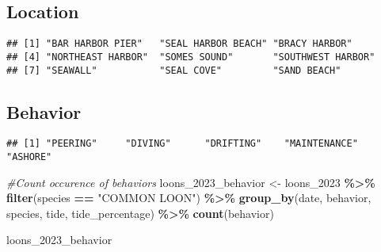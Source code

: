 \documentclass[
]{article}
\newenvironment{Shaded}{\begin{snugshade}}{\end{snugshade}}
\newcommand{\CommentTok}[1]{\textcolor[rgb]{0.56,0.35,0.01}{\textit{#1}}}
\newcommand{\FunctionTok}[1]{\textcolor[rgb]{0.13,0.29,0.53}{\textbf{#1}}}
\newcommand{\NormalTok}[1]{#1}
\newcommand{\OtherTok}[1]{\textcolor[rgb]{0.56,0.35,0.01}{#1}}
\newcommand{\SpecialCharTok}[1]{\textcolor[rgb]{0.81,0.36,0.00}{\textbf{#1}}}
\newcommand{\StringTok}[1]{\textcolor[rgb]{0.31,0.60,0.02}{#1}}
\begin{document}
\hypertarget{location}{%
\subsection{Location}\label{location}}

\begin{Shaded}
\end{Shaded}

\begin{verbatim}
## [1] "BAR HARBOR PIER"   "SEAL HARBOR BEACH" "BRACY HARBOR"     
## [4] "NORTHEAST HARBOR"  "SOMES SOUND"       "SOUTHWEST HARBOR" 
## [7] "SEAWALL"           "SEAL COVE"         "SAND BEACH"
\end{verbatim}

\hypertarget{behavior}{%
\subsection{Behavior}\label{behavior}}

\begin{Shaded}
\end{Shaded}

\begin{verbatim}
## [1] "PEERING"     "DIVING"      "DRIFTING"    "MAINTENANCE" "ASHORE"
\end{verbatim}

\begin{Shaded}
\begin{Highlighting}[]
\CommentTok{\#Count occurence of behaviors}
\NormalTok{loons\_2023\_behavior }\OtherTok{\textless{}{-}}\NormalTok{ loons\_2023 }\SpecialCharTok{\%\textgreater{}\%} 
  \FunctionTok{filter}\NormalTok{(species }\SpecialCharTok{==} \StringTok{"COMMON LOON"}\NormalTok{) }\SpecialCharTok{\%\textgreater{}\%} 
  \FunctionTok{group\_by}\NormalTok{(date, behavior, species, tide, tide\_percentage) }\SpecialCharTok{\%\textgreater{}\%} 
  \FunctionTok{count}\NormalTok{(behavior)}

\NormalTok{loons\_2023\_behavior}
\end{Highlighting}
\end{Shaded}
\end{document}
